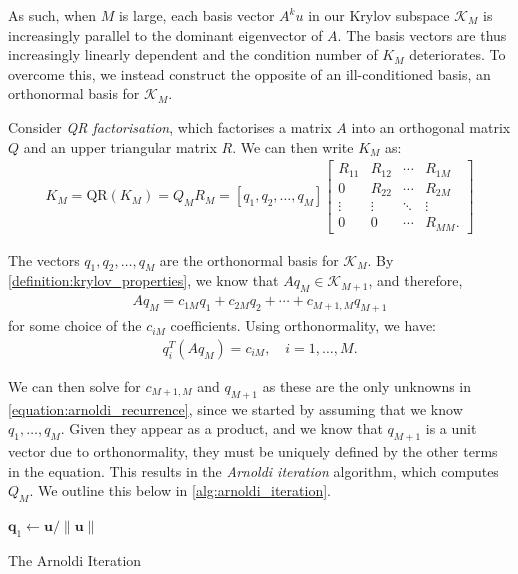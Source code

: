 As such, when $M$ is large, each basis vector $A^k u$ in our Krylov subspace $\mathcal{K}_M$ is increasingly parallel to the dominant eigenvector of $A$. The basis vectors are thus increasingly linearly dependent and the condition number of $K_M$ deteriorates. To overcome this, we instead construct the opposite of an ill-conditioned basis, an orthonormal basis for $\mathcal{K}_M$. 

Consider \textit{QR factorisation}, which factorises a matrix $A$ into an orthogonal matrix $Q$ and an upper triangular matrix $R$. We can then write $K_M$ as:
\begin{align}
K_M = \text{QR}(K_M) = Q_M R_M = [q_1, q_2, \ldots, q_M] 
\begin{bmatrix} 
R_{11} & R_{12} & \cdots & R_{1M} \\ 
0 & R_{22} & \cdots & R_{2M} \\ 
\vdots & \vdots & \ddots & \vdots \\ 
0 & 0 & \cdots & R_{MM}.
\end{bmatrix}
\end{align}

The vectors $q_1, q_2, \ldots, q_M$ are the orthonormal basis for $\mathcal{K}_M$. By \cref{definition:krylov_properties}, we know that $A q_M \in \mathcal{K}_{M+1}$, and therefore,
\begin{align}
A q_M =c_{1M} q_1 + c_{2M} q_2 + \cdots + c_{M+1,M} q_{M+1}
\label{equation:arnoldi_recurrence}
\end{align}
for some choice of the $c_{iM}$ coefficients. Using orthonormality, we have:
\begin{align}
q_i^T(A q_M) = c_{iM}, \quad i = 1,\ldots,M.
\label{equation:cij_projection}
\end{align}

We can then solve for $c_{M+1,M}$ and $q_{M+1}$ as these are the only unknowns in \cref{equation:arnoldi_recurrence}, since we started by assuming that we know $q_1, \ldots, q_M$. Given they appear as a product, and we know that $q_{M+1}$ is a unit vector due to orthonormality, they must be uniquely defined by the other terms in the equation. This results in the \textit{Arnoldi iteration} algorithm, which computes $Q_M$. We outline this below in \cref{alg:arnoldi_iteration}.

\begin{algorithm}[H]
    \DontPrintSemicolon
    $\mathbf{q}_1 \leftarrow \mathbf{u} / \|\mathbf{u}\|$\; 
    \caption{The Arnoldi Iteration}
    \label{alg:arnoldi_iteration}
\end{algorithm}

